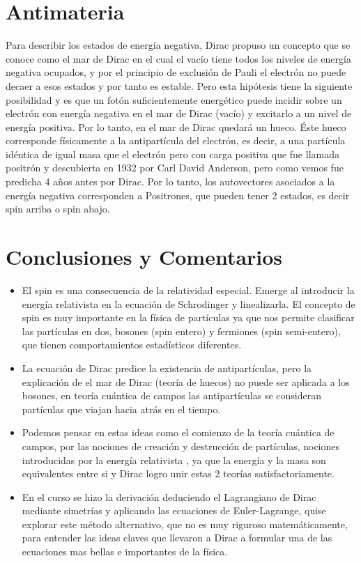 \documentclass[twocolumn]{article}
\begin{document}
\section{Antimateria}
Para describir los estados de energía negativa, Dirac propuso un concepto que se conoce como el mar de Dirac en el cual el vacío tiene todos los niveles de energía  negativa ocupados, y por el principio de exclusión de Pauli el electrón no puede decaer a esos estados y por tanto es estable. Pero esta hipótesis tiene la siguiente posibilidad y es que un fotón suficientemente energético puede incidir sobre un electrón con energía negativa en el mar de Dirac (vacío) y excitarlo a un nivel de energía positiva. Por lo tanto, en el mar de Dirac quedará un hueco. Éste hueco corresponde físicamente a la antipartícula del electrón, es decir, a una partícula idéntica de igual masa  que el electrón pero con carga positiva que fue llamada positrón y descubierta en 1932 por Carl David Anderson, pero como vemos fue predicha 4 años antes por Dirac.
Por lo tanto, los autovectores asociados a la energía negativa corresponden a Positrones, que pueden tener 2 estados, es decir spin arriba o spin abajo.

\section{Conclusiones y Comentarios}
\begin{itemize}
    \item El spin es una consecuencia de la relatividad especial. Emerge al introducir la energía relativista en la ecuación de Schrodinger y linealizarla. El concepto de spin es muy importante en la física de partículas ya que nos permite clasificar las partículas en dos, bosones (spin entero) y fermiones (spin semi-entero), que tienen comportamientos estadísticos diferentes.
    \item La ecuación de Dirac predice la existencia de antipartículas, pero la explicación de el mar de Dirac (teoría de huecos) no puede ser aplicada a los bosones, en teoría cuántica de campos las antipartículas se consideran partículas que viajan hacia atrás en el tiempo.
    \item Podemos pensar en estas ideas como el comienzo de la teoría cuántica de campos, por las nociones de creación y destrucción de partículas, nociones introducidas por la energía relativista , ya que la energía y la masa son equivalentes entre si y Dirac logro unir estas 2 teorías satisfactoriamente.
    \item En el curso se hizo la derivación deduciendo el Lagrangiano de Dirac mediante simetrías y aplicando las ecuaciones de Euler-Lagrange, quise explorar este método alternativo, que no es muy riguroso matemáticamente, para entender las ideas claves  que llevaron a Dirac a formular una de las ecuaciones mas bellas e importantes de la física.
\end{itemize}
\end{document}
